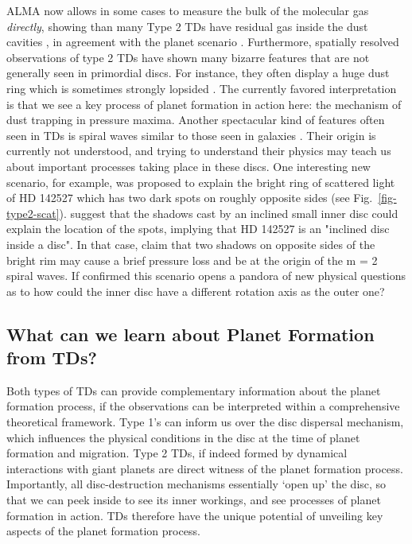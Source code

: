 \documentclass[10pt,fleqn,twoside]{article}
\begin{document}
ALMA now allows in some cases to measure the bulk of the molecular gas {\it
  directly}, showing than many Type 2 TDs have residual gas inside the
dust cavities \citep{2016A&A...585A..58V}, in agreement with the
planet scenario \citep[but see also][]{2016arXiv160907510W}.
Furthermore, spatially resolved observations of type
2 TDs have shown many bizarre features that are
not generally seen in primordial discs. For instance, they
  often display a huge dust ring \citep[e.g.,][]{2013Natur.493..191C}
  which is sometimes strongly lopsided 
  \citep[e.g.,][]{2013Sci...340.1199V}. The currently favored interpretation is that we see a
  key process of planet formation in action here: the mechanism of dust
  trapping in pressure maxima. Another spectacular kind of features often
  seen in TDs is spiral waves similar to those seen in galaxies
  \citep[e.g.,][]{2012ApJ...748L..22M, 2015A&A...578L...6B, 2015ApJ...813L...2W}.
  Their origin is currently not
  understood, and trying to understand their physics may teach us about
important processes taking place in these discs. One interesting new
scenario, for example, was proposed to explain the bright ring of scattered light of
HD 142527 which has two dark spots on roughly opposite sides (see Fig.~\ref{fig-type2-scat}). 
\citet{2015ApJ...798L..44M} suggest that the shadows cast by an inclined small inner
disc could explain the location of the spots, implying that HD 142527
is an "inclined disc inside a disc". In that case, \citet{2016ApJ...823L...8M}
 claim that two shadows on opposite sides of the
bright rim may cause a brief pressure loss and be at the origin of the
m = 2 spiral waves. If confirmed this scenario opens a pandora of new
physical questions as to how could the inner disc have a different
rotation axis as the outer one?  \\

\subsection{What can we learn about Planet Formation from TDs? }

Both types of TDs can provide complementary information about the
planet formation process, if the observations can be interpreted
within a comprehensive theoretical framework. Type 1's
can inform us over the disc dispersal mechanism, which influences the
physical conditions in the disc at the time of planet formation and
migration. Type 2 TDs, if indeed formed by dynamical interactions with
giant planets are direct witness of the planet formation
process. Importantly, all disc-destruction mechanisms essentially `open up' the
  disc, so that we can peek inside to see its inner workings, and see
  processes of planet formation in action. TDs therefore
  have the unique potential of unveiling key aspects of the planet formation
process.
\end{document}
